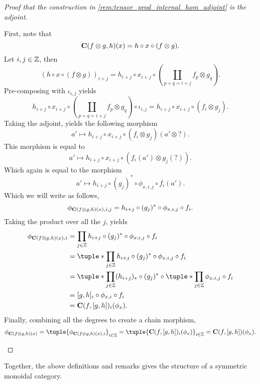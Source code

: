 \begin{proof}[Proof that the construction in \autoref{rem:tensor_prod_internal_hom_adjoint} is the adjoint]
\begin{enumerate}
{            First, note that
            \[
                \operatorname{\mathbf{C}}(f \otimes g, h)(x) = h \circ x \circ (f \otimes g).
            \]
            Let \( i, j \in {\mathbb{Z}} \), then
            \[
                (h \circ x \circ (f \otimes g))_{i + j} = h_{i + j} \circ x_{i + j} \circ (\coprod_{p + q = i + j} f_p \otimes g_q).
            \]
            Pre-composing with \( \iota_{i, j} \) yields
            \[
                h_{i + j} \circ x_{i + j} \circ (\coprod_{p + q = i + j} f_p \otimes g_q) \circ \iota_{i, j} = h_{i + j} \circ x_{i + j} \circ (f_i \otimes g_j).
            \]
            Taking the adjoint, yields the following morphism
            \[
                a' \mapsto h_{i + j} \circ x_{i + j} \circ (f_i \otimes g_j)(a' \otimes ?).
            \]
            This morphism is equal to
            \[
                a' \mapsto h_{i + j} \circ x_{i + j} \circ (f_i (a') \otimes g_j(?)).
            \]
            Which again is equal to the morphism
            \[
                a' \mapsto h_{i + j} \circ (g_j)^* \circ \phi_{x, i, j} \circ f_i(a').
            \]
            Which we will write as follows,
            \[
                \phi_{\operatorname{\mathbf{C}}(f \otimes g, h)(x), i, j} = h_{i + j} \circ (g_j)^* \circ \phi_{x, i, j} \circ f_i.
            \]
            Taking the product over all the \( j \), yields
            \begin{align*}
                \phi_{\C(f \otimes g, h) (x), i} &= \prod_{j \in \Zb} h_{i + j} \circ (g_j)^* \circ \phi_{x, i, j} \circ f_i \\
                &= \tuple*{\prod_{j \in \Zb} h_{i + j} \circ (g_j)^* \circ \phi_{x, i, j}} \circ f_i \\
                &= \tuple*{\prod_{j \in \Zb} (h_{i + j})_* \circ (g_j)^*} \circ \tuple*{\prod_{j \in \Zb} \phi_{x, i, j}} \circ f_i \\
                &= [g, h]_i \circ \phi_{x, i} \circ f_i \\
                &= \C(f, [g, h])_i (\phi_x).
            \end{align*}
            Finally, combining all the degrees to create a chain morphism,
            \[
                \phi_{\C(f \otimes g, h) (x)} = \tuple{\phi_{\C(f \otimes g, h) (x), i}}_{i \in \Zb} = \tuple{\C(f, [g, h])_i (\phi_x)}_{i \in \Zb} = \C(f, [g, h]) (\phi_x). \qedhere
            \]
        }
    \end{enumerate}
\end{proof}

Together, the above definitions and remarks gives the structure of a symmetric monoidal category.

